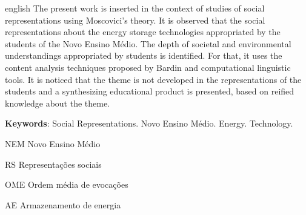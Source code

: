 \documentclass[
  12pt,       %
  openright,      %
  twoside,      %
  a4paper,      %
  english,      %
  french,       %
  spanish,      %
  brazil        %
  ]{abntex2}
\newcommand{\listofquadrosname}{Lista de quadros}
\begin{document}
\begin{resumo}[Abstract]
 \begin{otherlanguage*}{english}
   The present work is inserted in the context of studies of social representations using Moscovici's theory. It is observed that the social representations about the energy storage technologies appropriated by the students of the Novo Ensino Médio. The depth of societal and environmental understandings appropriated by students is identified. For that, it uses the content analysis techniques proposed by Bardin and computational linguistic tools. It is noticed that the theme is not developed in the representations of the students and a synthesizing educational product is presented, based on reified knowledge about the theme.

   \vspace{\onelineskip}
 
   \noindent 
   \textbf{Keywords}: Social Representations. Novo Ensino Médio. Energy. Technology.
 \end{otherlanguage*}
\end{resumo}




\pdfbookmark[0]{\listofquadrosname}{loq}
\listofquadros*
\cleardoublepage


\begin{siglas}
  \item[NEM] Novo Ensino Médio
  \item[RS] Representações sociais
  \item[OME] Ordem média de evocações
  \item[AE] Armazenamento de energia
\end{siglas}
\end{document}
